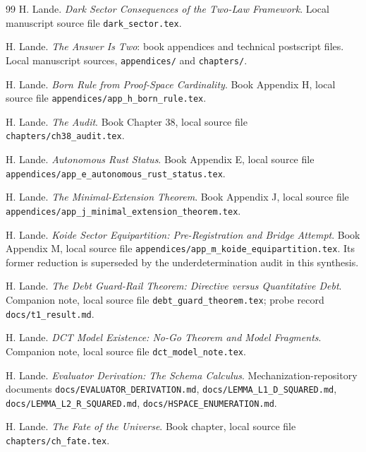 \documentclass[11pt]{article}
\theoremstyle{plain}
\theoremstyle{definition}
\theoremstyle{remark}
\begin{document}
\begin{thebibliography}{99}
H. Lande.
\newblock \emph{Dark Sector Consequences of the Two-Law Framework}.
\newblock Local manuscript source file \texttt{dark\_sector.tex}.

H. Lande.
\newblock \emph{The Answer Is Two}: book appendices and technical postscript files.
\newblock Local manuscript sources, \texttt{appendices/} and \texttt{chapters/}.

H. Lande.
\newblock \emph{Born Rule from Proof-Space Cardinality}.
\newblock Book Appendix H, local source file \texttt{appendices/app\_h\_born\_rule.tex}.

H. Lande.
\newblock \emph{The Audit}.
\newblock Book Chapter 38, local source file \texttt{chapters/ch38\_audit.tex}.

H. Lande.
\newblock \emph{Autonomous Rust Status}.
\newblock Book Appendix E, local source file \texttt{appendices/app\_e\_autonomous\_rust\_status.tex}.

H. Lande.
\newblock \emph{The Minimal-Extension Theorem}.
\newblock Book Appendix J, local source file \texttt{appendices/app\_j\_minimal\_extension\_theorem.tex}.

H. Lande.
\newblock \emph{Koide Sector Equipartition: Pre-Registration and Bridge Attempt}.
\newblock Book Appendix M, local source file \texttt{appendices/app\_m\_koide\_equipartition.tex}. Its former reduction is superseded by the underdetermination audit in this synthesis.

H. Lande.
\newblock \emph{The Debt Guard-Rail Theorem: Directive versus Quantitative Debt}.
\newblock Companion note, local source file \texttt{debt\_guard\_theorem.tex}; probe record \texttt{docs/t1\_result.md}.

H. Lande.
\newblock \emph{DCT Model Existence: No-Go Theorem and Model Fragments}.
\newblock Companion note, local source file \texttt{dct\_model\_note.tex}.

H. Lande.
\newblock \emph{Evaluator Derivation: The Schema Calculus}.
\newblock Mechanization-repository documents \texttt{docs/EVALUATOR\_DERIVATION.md}, \texttt{docs/LEMMA\_L1\_D\_SQUARED.md}, \texttt{docs/LEMMA\_L2\_R\_SQUARED.md}, \texttt{docs/HSPACE\_ENUMERATION.md}.

H. Lande.
\newblock \emph{The Fate of the Universe}.
\newblock Book chapter, local source file \texttt{chapters/ch\_fate.tex}.


\end{thebibliography}
\end{document}
